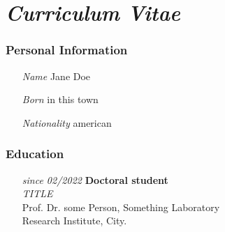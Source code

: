 \clearpage
{}
\chapter*{\textit{Curriculum Vitae}}

\subsection*{Personal Information}

\begin{itemize}
\setlength\itemsep{-0.5em}
    \item [\emph{Name}] Jane Doe
    \item [\emph{Born}]  in this town
    \item [\emph{Nationality}] american
\end{itemize}


\subsection*{Education}

\begin{itemize}
    \item [\emph{since 02/2022}] \textbf{Doctoral student} \\
     \emph{TITLE} \\
     Prof. Dr. some Person, Something Laboratory \\
     Research Institute, City.
\end{itemize}

